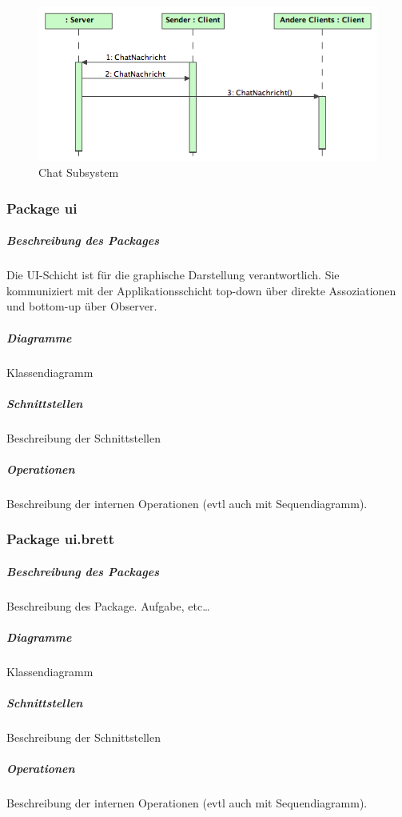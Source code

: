 \documentclass[a4paper,12pt,halfparskip,DIV14]{scrartcl}
\begin{document}
\begin{figure}
	[htp] \centering 
	\includegraphics[width=1\textwidth]{dienste_chat.png} \caption{Chat Subsystem}\label{fig:dienste_chat.png} 
\end{figure}

\clearpage
\subsubsection{Package ui} %
\label{ssub:package_ui}
\subparagraph{Beschreibung des Packages} %
\label{ssub:beschreibung_des_packages}
Die UI-Schicht ist für die graphische Darstellung verantwortlich. Sie kommuniziert mit der Applikationsschicht top-down über direkte Assoziationen und bottom-up über Observer.
\subparagraph{Diagramme} %
\label{ssub:diagramme}
Klassendiagramm
\subparagraph{Schnittstellen} %
\label{ssub:schnittstellen}
Beschreibung der Schnittstellen
\subparagraph{Operationen} %
\label{ssub:operationen}
Beschreibung der internen Operationen (evtl auch mit Sequendiagramm).

\clearpage
\subsubsection{Package ui.brett} %
\label{ssub:package_ui_brett}
\subparagraph{Beschreibung des Packages} %
\label{ssub:beschreibung_des_packages}
Beschreibung des Package. Aufgabe, etc…
\subparagraph{Diagramme} %
\label{ssub:diagramme}
Klassendiagramm
\subparagraph{Schnittstellen} %
\label{ssub:schnittstellen}
Beschreibung der Schnittstellen
\subparagraph{Operationen} %
\label{ssub:operationen}
Beschreibung der internen Operationen (evtl auch mit Sequendiagramm).
\end{document}
